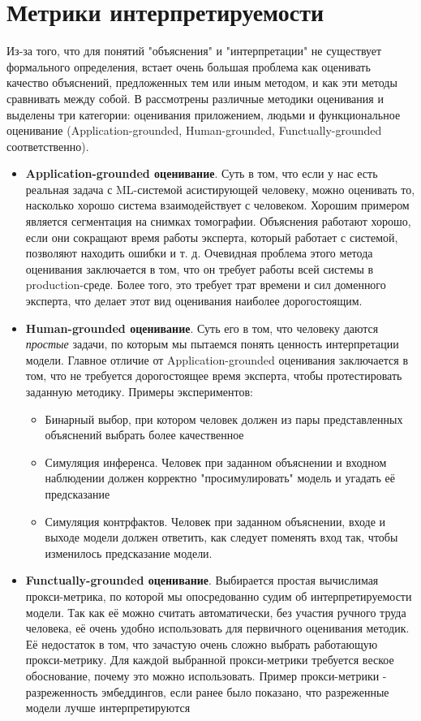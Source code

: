 \chapter{Метрики интерпретируемости}

Из-за того, что для понятий "объяснения" и "интерпретации" не существует формального определения, встает очень большая проблема как оценивать качество объяснений, предложенных тем или иным методом, и как эти методы сравнивать между собой. В  рассмотрены различные методики оценивания и выделены три категории: оценивания приложением, людьми и функциональное оценивание (Application-grounded, Human-grounded, Functually-grounded соответственно).

\begin{itemize}
    \item \textbf{Application-grounded оценивание}. Суть в том, что если у нас есть реальная задача с ML-системой асистирующей человеку, можно оценивать то, насколько хорошо система взаимодействует с человеком. Хорошим примером является сегментация на снимках томографии. Объяснения работают хорошо, если они сокращают время работы эксперта, который работает с системой, позволяют находить ошибки и т. д.
    Очевидная проблема этого метода оценивания заключается в том, что он требует работы всей системы в production-среде. Более того, это требует трат времени и сил доменного эксперта, что делает этот вид оценивания наиболее дорогостоящим. 
    \item \textbf{Human-grounded оценивание}. Суть его в том, что человеку даются \textit{простые} задачи, по которым мы пытаемся понять ценность интерпретации модели. Главное отличие от Application-grounded оценивания заключается в том, что не требуется дорогостоящее время эксперта, чтобы протестировать заданную методику. Примеры экспериментов:
    \begin{itemize}
        \item Бинарный выбор, при котором человек должен из пары представленных объяснений выбрать более качественное
        \item Симуляция инференса. Человек при заданном объяснении и входном наблюдении должен корректно "просимулировать" модель и угадать её предсказание
        \item Симуляция контрфактов. Человек при заданном объяснении, входе и выходе модели должен ответить, как следует поменять вход так, чтобы изменилось предсказание модели.
    \end{itemize}
    \item \textbf{Functually-grounded оценивание}. Выбирается простая вычислимая прокси-метрика, по которой мы опосредованно судим об интерпретируемости модели. Так как её можно считать автоматически, без участия ручного труда человека, её очень удобно использовать для первичного оценивания методик. Её недостаток в том, что зачастую очень сложно выбрать работающую прокси-метрику. Для каждой выбранной прокси-метрики требуется веское обоснование, почему это можно использовать.
    Пример прокси-метрики - разреженность эмбеддингов, если ранее было показано, что разреженные модели лучше интерпретируются
\end{itemize}

